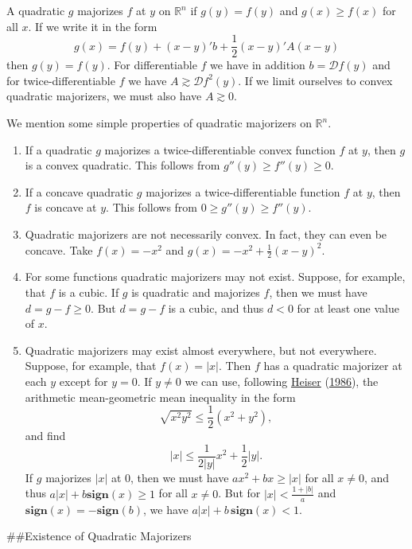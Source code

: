 \documentclass[
  12pt,
]{book}
\begin{document}
A quadratic \(g\) majorizes \(f\) at \(y\) on \(\mathbb{R}^n\) if \(g(y)=f(y)\) and \(g(x)\geq f(x)\) for all \(x\). If we write it in the form
\[
g(x)=f(y)+(x-y)'b+\frac12 (x-y)'A(x-y)
\]
then \(g(y)=f(y)\). For differentiable \(f\) we have in
addition \(b=\mathcal{D}f(y)\) and for twice-differentiable \(f\)
we have \(A\gtrsim\mathcal{D}f^2(y).\) If we limit ourselves to convex quadratic majorizers, we must also have \(A\gtrsim 0\).

We mention some simple properties of quadratic majorizers on \(\mathbb{R}^n\).

\begin{enumerate}
\def\labelenumi{\arabic{enumi}.}
\item
  If a quadratic \(g\) majorizes a twice-differentiable convex function \(f\) at \(y\), then \(g\) is a convex quadratic. This follows from \(g''(y)\geq f''(y)\geq 0\).
\item
  If a concave quadratic \(g\) majorizes a twice-differentiable function \(f\)
  at \(y\), then \(f\) is concave at \(y\). This follows from \(0\geq g''(y)\geq f''(y)\).
\item
  Quadratic majorizers are not necessarily convex. In fact, they can even be concave. Take \(f(x)=-x^2\) and \(g(x)=-x^2+\frac12(x-y)^2\).
\item
  For some functions quadratic majorizers may not exist. Suppose, for example, that \(f\) is a cubic. If \(g\) is quadratic and majorizes \(f\), then we must have \(d=g-f\geq 0\). But \(d=g-f\) is a cubic, and thus \(d<0\) for at least one value of \(x\).
\item
  Quadratic majorizers may exist almost everywhere, but not everywhere. Suppose, for example, that \(f(x)=|x|\). Then \(f\) has a quadratic majorizer at each \(y\) except for \(y=0\). If \(y\not= 0\) we can use, following \protect\hyperlink{ref-heiser_86}{Heiser} (\protect\hyperlink{ref-heiser_86}{1986}), the arithmetic mean-geometric mean inequality in the form
  \[
  \sqrt{x^{2}y^{2}}\leq\frac{1}{2}(x^{2}+y^{2}),
  \]
  and find
  \[
  |x|\leq\frac{1}{2|y|}x^{2}+\frac{1}{2}|y|.
  \]
  If \(g\) majorizes \(|x|\) at 0, then we must have \(ax^{2}+bx\geq |x|\) for all \(x\not= 0\), and thus \(a|x|+b\mathbf{sign}(x)\geq 1\) for all \(x\not= 0\).
  But for \(|x|<\frac{1+|b|}{a}\) and \(\mathbf{sign}(x) = -\mathbf{sign}(b)\),
  we have \(a|x|+b\,\mathbf{sign}(x)<1\).
\end{enumerate}

\#\#Existence of Quadratic Majorizers
\end{document}
